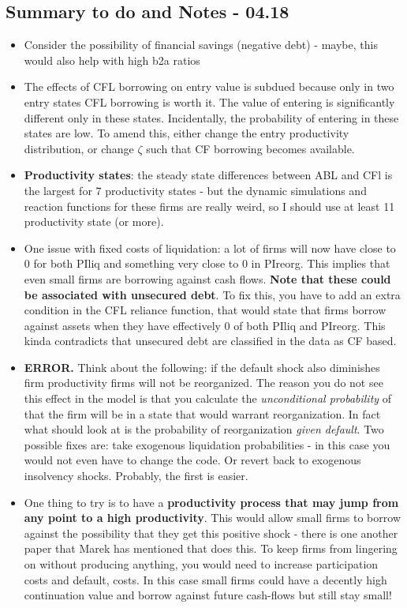 \documentclass[12pt]{article}
\begin{document}
\subsection*{Summary to do and Notes - 04.18}
\begin{itemize}
    \item Consider the possibility of financial savings (negative debt) - maybe, this would also help with high b2a ratios
    \item The effects of CFL borrowing on entry value is subdued because only in two entry states CFL borrowing is worth it. The value of entering is significantly different only in these states. Incidentally, the probability of entering in these states are low. To amend this, either change the entry productivity distribution, or change $\zeta$ such that CF borrowing becomes available.
    \item \textbf{Productivity states}: the steady state differences between ABL and CFl is the largest for 7 productivity states - but the dynamic simulations and reaction functions for these firms are really weird, so I should use at least 11 productivity state (or more).
    \item One issue with fixed costs of liquidation: a lot of firms will now have close to 0 for both PIliq and something very close to 0 in PIreorg. This implies that even small firms are borrowing against cash flows.  \textbf{Note that these could be associated with unsecured debt}. To fix this, you have to add an extra condition in the CFL reliance function, that would state that firms borrow against assets when they have effectively 0 of both PIliq and PIreorg. This kinda contradicts that unsecured debt are classified in the data as CF based.
    \item \textbf{ERROR.} Think about the following: if the default shock also diminishes firm productivity firms will not be reorganized. The reason you do not see this effect in the model is that you calculate the \textit{unconditional probability} of that the firm will be in a state that would warrant reorganization. In fact what should look at is the probability of reorganization \textit{given default}. Two possible fixes are: take exogenous liquidation probabilities - in this case you would not even have to change the code. Or revert back to exogenous insolvency shocks. Probably, the first is easier.
    \item One thing to try is to have a \textbf{productivity process that may jump from any point to a high productivity}. This would allow small firms to borrow against the possibility that they get this positive shock - there is one another paper that Marek has mentioned that does this. To keep firms from lingering on without producing anything, you would need to increase participation costs and default, costs. In this case small firms could have a decently high continuation value and borrow against future cash-flows but still stay small! 
\end{itemize}
    
\end{document}
